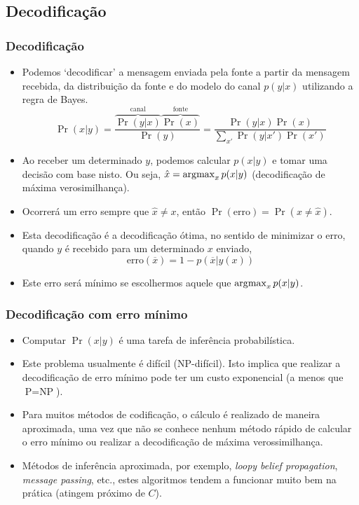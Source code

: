 \subsection{Decodificação}
\begin{frame}[allowframebreaks]
  \frametitle{Decodificação}
  \begin{itemize}
  \item Podemos `decodificar' a mensagem enviada pela fonte a partir da mensagem recebida,
	da distribuição da fonte e do modelo do canal $p(y|x)$ utilizando a regra de Bayes.
	\begin{equation}
	\Pr (x|y) = \frac{\overbrace{\Pr(y|x)}^{\text{canal}} \overbrace{\Pr(x)}^{\text{fonte}} }{ \Pr(y) } = \frac{ \Pr(y|x) \Pr(x) }{ \sum_{x'} \Pr(y|x') \Pr(x')}
	\end{equation}
  \item Ao receber um determinado $y$, podemos calcular $p(x|y)$ e tomar uma decisão com base nisto.
	Ou seja, $\hat{x} = \operatorname*{\arg\!\max}_x p(x|y)$ (decodificação de máxima verosimilhança).
  \item Ocorrerá um erro sempre que $\hat{x} \neq x$, então $\Pr(\text{erro}) = \Pr(x \neq \hat{x})$.
  \item Esta decodificação é a decodificação ótima, no sentido de minimizar o erro,
	quando $y$ é recebido para um determinado $x$ enviado,
	\begin{equation}
	\text{erro}(\overline{x}) = 1 - p(\overline{x}|y(x))
	\end{equation}
  \item Este erro será mínimo se escolhermos aquele que $\operatorname*{\arg\!\max}_x p(x|y)$.
  \end{itemize} 
\end{frame}

\begin{frame}[allowframebreaks]
  \frametitle{Decodificação com erro mínimo}
  \begin{itemize}
  \item Computar $\Pr(x|y)$ é uma tarefa de inferência probabilística.
  \item Este problema usualmente é difícil (NP-difícil). Isto implica que
	realizar a decodificação de erro mínimo pode ter um custo exponencial (a menos que $\text{P}=\text{NP}$).
  \item Para muitos métodos de codificação, o cálculo é realizado de maneira aproximada, uma vez que não
	se conhece nenhum método rápido de calcular o erro mínimo ou realizar a decodificação de máxima verossimilhança.
  \item Métodos de inferência aproximada, por exemplo, \textit{loopy belief propagation}, \textit{message passing}, etc., 
	estes algoritmos tendem a funcionar muito bem na prática (atingem próximo de $C$).
  \end{itemize}
\end{frame}


